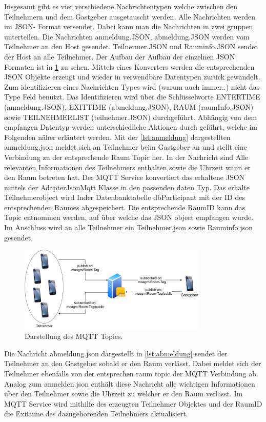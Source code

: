 Insgesamt gibt es vier verschiedene Nachrichtentypen welche zwischen den Teilnehmern und dem Gastgeber ausgetauscht werden. Alle Nachrichten werden im JSON- Format versendet. Dabei kann man die Nachrichten in zwei gruppen unterteilen. Die Nachrichten anmeldung.JSON, abmeldung.JSON werden vom Teilnehmer an den Host gesendet. Teilnermer.JSON und Rauminfo.JSON sendet der Host an alle Teilnehmer. Der Aufbau der Aufbau der einzelnen JSON Formaten ist in \cref{img:mqtt} zu sehen. Mittels eines Konverters werden die entsprechenden JSON Objekte erzeugt und wieder in verwendbare Datentypen zurück gewandelt. Zum identifizieren eines Nachrichten Types wird (warum auch immer..) nicht das Type Feld benutzt. Das Identifizieren wird über die Schlüsselworte ENTERTIME (anmeldung.JSON), EXITTIME (abmeldung.JSON), RAUM (raumInfo.JSON) sowie TEILNEHMERLIST (teilnehmer.JSON) durchgeführt. Abhängig von dem empfangen Datentyp werden unterschiedliche Aktionen durch geführt, welche im Folgenden näher erläutert werden. 
Mit der \cref{lst:anmeldung} dargestellten anmeldung.json meldet sich an Teilnehmer beim Gastgeber an und stellt eine Verbindung zu der entsprechende Raum Topic her. In der Nachricht sind Alle relevanten Informationen des Teilnehmers enthalten sowie die Uhrzeit wann er den Raum betreten hat. Der MQTT Service konvertiert das erhaltene JSON mittels der AdapterJsonMqtt Klasse in den passenden daten Typ. Das erhalte Teilnehmerobject wird Inder Datenbanktabelle dbParticipant mit der ID des entsprechenden Raumes abgespeichert. Die entsprechende RaumID kann das Topic entnommen werden, auf über welche das JSON object empfangen wurde. Im Anschluss wird an alle Teilnehmer ein Teilnehmer.json sowie Rauminfo.json gesendet.

\begin{figure}
	\centering
	\includegraphics[width =0.8\textwidth]{images/mqttservice.pdf}
	\caption{Darstellung des MQTT Topics.}
	\label{img:mqtt}
\end{figure}

Die Nachricht abmeldung.json dargestellt in \cref{lst:abmeldung}   sendet der Teilnehmer an den Gastgeber sobald er den Raum verlässt. Dabei meldet sich der Teilnehmer ebenfalls von der entsprechen raum topic der MQTT Verbindung ab. Analog zum anmelden.json enthält diese Nachricht alle wichtigen Informationen über den Teilnehmer sowie die Uhrzeit zu welcher er den Raum verlässt. Im MQTT Service wird mithilfe des erzeugten Teilnehmer Objektes und der RaumID die Exittime des dazugehörenden Teilnehmers aktualisiert.  

